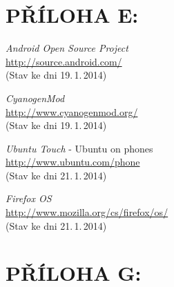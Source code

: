 \documentclass[12pt, a4paper, oneside]{article}
\newcommand{\It}{\textit}  %
\begin{document}
\newpage
 \section*{PŘÍLOHA E:}
 \begin{thebibliography}{99}

     \It{Android Open Source Project} \\
    \url{http://source.android.com/}\\
    (Stav ke dni 19.\,1.\,2014)

     \It{CyanogenMod} \\
    \url{http://www.cyanogenmod.org/}\\
    (Stav ke dni 19.\,1.\,2014)

     \It{Ubuntu Touch} - Ubuntu on phones \\
    \url{http://www.ubuntu.com/phone}\\
    (Stav ke dni 21.\,1.\,2014)

     \It{Firefox OS}\\
    \url{http://www.mozilla.org/cs/firefox/os/}\\
    (Stav ke dni 21.\,1.\,2014)


\end{thebibliography}

\newpage
\section*{PŘÍLOHA G:}
~
\listoffigures   %
\end{document}
